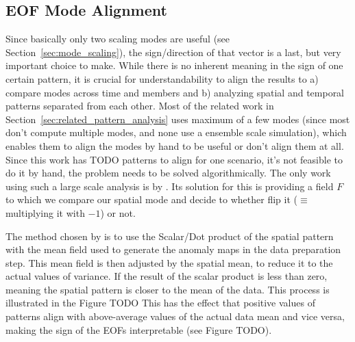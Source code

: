 \subsection{EOF Mode Alignment}
\label{sec:mode_alignment}

Since basically only two scaling modes are useful (see Section~\ref{sec:mode_scaling}), the sign/direction of that vector is a last, but very important choice to make.
While there is no inherent meaning in the sign of one certain pattern, it is crucial for understandability to align the results to a) compare modes across time and members and b) analyzing spatial and temporal patterns separated from each other. 
Most of the related work in Section~\ref{sec:related_pattern_analysis} uses maximum of a few modes (since most don't compute multiple modes, and none use a ensemble scale simulation), which enables them to align the modes by hand to be useful or don't align them at all.
Since this work has TODO patterns to align for one scenario, it's not feasible to do it by hand, the problem needs to be solved algorithmically. 
The only work using such a large scale analysis is by \citeauthor{vietinghoffdiss} \cite{vietinghoffdiss}.  
Its solution for this is providing a field $F$ to which we compare our spatial mode and decide to whether flip it ($\equiv$ multiplying it with $-1$) or not. 

The method chosen by \citeauthor{vietinghoffdiss} \cite{vietinghoffdiss} is to use the Scalar/Dot product of the spatial pattern with the mean field used to generate the anomaly maps in the data preparation step. 
This mean field is then adjusted by the spatial mean, to reduce it to the actual values of variance. 
If the result of the scalar product is less than zero, meaning the spatial pattern is closer to the mean of the data. 
This process is illustrated in the Figure TODO  
This has the effect that positive values of patterns align with above-average values of the actual data mean and vice versa, making the sign of the EOFs interpretable \cite{vietinghoffdiss} (see Figure TODO). 

